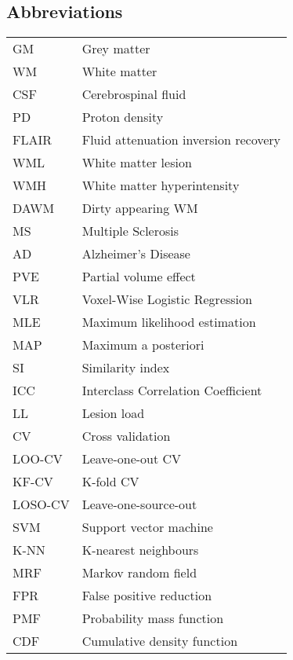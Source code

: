 \begin{singlespacing}
\tableofcontents
\newpage
\listoffigures
\newpage
\listoftables
\newpage
\subsection*{Abbreviations}
\begin{table}[H]
  \begin{tabular}{ll}
  	\hline
  	GM      & Grey matter                          \\
  	WM      & White matter                         \\
  	CSF     & Cerebrospinal fluid                  \\
  	PD      & Proton density                       \\
  	FLAIR   & Fluid attenuation inversion recovery \\
  	WML     & White matter lesion                  \\
  	WMH     & White matter hyperintensity          \\
  	DAWM    & Dirty appearing WM                   \\
  	MS      & Multiple Sclerosis                   \\
  	AD      & Alzheimer's Disease                  \\
  	PVE     & Partial volume effect                \\
  	VLR     & Voxel-Wise Logistic Regression       \\
  	MLE     & Maximum likelihood estimation        \\
  	MAP     & Maximum a posteriori                 \\
  	SI      & Similarity index                     \\
  	ICC     & Interclass Correlation Coefficient   \\
  	LL      & Lesion load                          \\
  	CV      & Cross validation                     \\
  	LOO-CV  & Leave-one-out CV                     \\
  	KF-CV   & K-fold CV                            \\
  	LOSO-CV & Leave-one-source-out                 \\
  	SVM     & Support vector machine               \\
  	K-NN    & K-nearest neighbours                 \\
  	MRF     & Markov random field                  \\
  	FPR     & False positive reduction             \\
    PMF     & Probability mass function            \\
    CDF     & Cumulative density function          \\ \hline
  \end{tabular}
\end{table}
\clearpage

\end{singlespacing}
